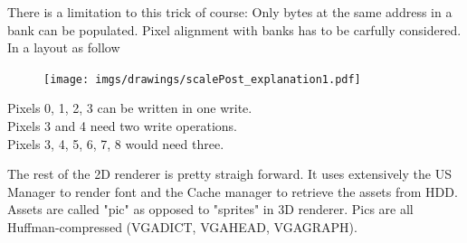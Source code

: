 \par



There is a limitation to this trick of course: Only bytes at the same address in a bank can be populated. Pixel alignment with banks has to be carfully considered. In a layout as follow\\
\par
\begin{figure}[H]
\centering
 \texttt{[image: imgs/drawings/scalePost\_explanation1.pdf]}
 \end{figure}
Pixels 0, 1, 2, 3 can be written in one write.\\
Pixels 3 and 4 need two write operations.\\
Pixels 3, 4, 5, 6, 7, 8 would need three.\\


\par
The rest of the 2D renderer is pretty straigh forward. It uses extensively the US Manager to render font and the Cache manager to retrieve the assets from HDD. Assets are called "pic" as opposed to "sprites" in 3D renderer. Pics are all Huffman-compressed (VGADICT, VGAHEAD, VGAGRAPH).
\par
{}